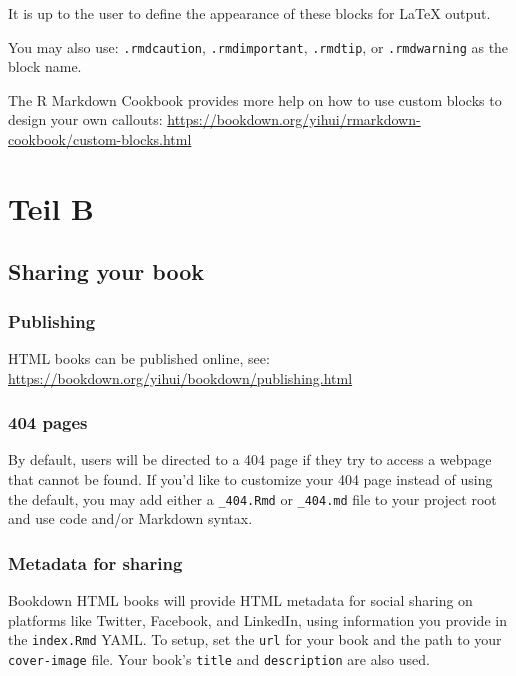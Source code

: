 \documentclass[
  oneside]{book}
\theoremstyle{definition}
\theoremstyle{definition}
\theoremstyle{definition}
\theoremstyle{definition}
\theoremstyle{remark}
\begin{document}
It is up to the user to define the appearance of these blocks for LaTeX output.

You may also use: \texttt{.rmdcaution}, \texttt{.rmdimportant}, \texttt{.rmdtip}, or \texttt{.rmdwarning} as the block name.

The R Markdown Cookbook provides more help on how to use custom blocks to design your own callouts: \url{https://bookdown.org/yihui/rmarkdown-cookbook/custom-blocks.html}

\hypertarget{part-teil-b}{%
\part*{Teil B}\label{part-teil-b}}

\hypertarget{sharing-your-book}{%
\chapter{Sharing your book}\label{sharing-your-book}}

\hypertarget{publishing}{%
\section{Publishing}\label{publishing}}

HTML books can be published online, see: \url{https://bookdown.org/yihui/bookdown/publishing.html}

\hypertarget{pages}{%
\section{404 pages}\label{pages}}

By default, users will be directed to a 404 page if they try to access a webpage that cannot be found. If you'd like to customize your 404 page instead of using the default, you may add either a \texttt{\_404.Rmd} or \texttt{\_404.md} file to your project root and use code and/or Markdown syntax.

\hypertarget{metadata-for-sharing}{%
\section{Metadata for sharing}\label{metadata-for-sharing}}

Bookdown HTML books will provide HTML metadata for social sharing on platforms like Twitter, Facebook, and LinkedIn, using information you provide in the \texttt{index.Rmd} YAML. To setup, set the \texttt{url} for your book and the path to your \texttt{cover-image} file. Your book's \texttt{title} and \texttt{description} are also used.
\end{document}
